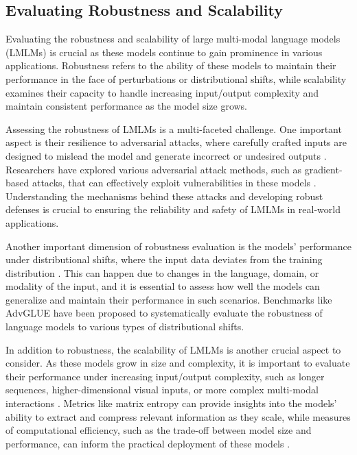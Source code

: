 \documentclass[11pt]{article}
\begin{document}
\subsection{Evaluating Robustness and Scalability}

Evaluating the robustness and scalability of large multi-modal language models (LMLMs) is crucial as these models continue to gain prominence in various applications. Robustness refers to the ability of these models to maintain their performance in the face of perturbations or distributional shifts, while scalability examines their capacity to handle increasing input/output complexity and maintain consistent performance as the model size grows.

Assessing the robustness of LMLMs is a multi-faceted challenge. One important aspect is their resilience to adversarial attacks, where carefully crafted inputs are designed to mislead the model and generate incorrect or undesired outputs \cite{ref174,ref102}. Researchers have explored various adversarial attack methods, such as gradient-based attacks, that can effectively exploit vulnerabilities in these models \cite{ref175,ref176}. Understanding the mechanisms behind these attacks and developing robust defenses is crucial to ensuring the reliability and safety of LMLMs in real-world applications.

Another important dimension of robustness evaluation is the models' performance under distributional shifts, where the input data deviates from the training distribution \cite{ref177}. This can happen due to changes in the language, domain, or modality of the input, and it is essential to assess how well the models can generalize and maintain their performance in such scenarios. Benchmarks like AdvGLUE \cite{ref178} have been proposed to systematically evaluate the robustness of language models to various types of distributional shifts.

In addition to robustness, the scalability of LMLMs is another crucial aspect to consider. As these models grow in size and complexity, it is important to evaluate their performance under increasing input/output complexity, such as longer sequences, higher-dimensional visual inputs, or more complex multi-modal interactions \cite{ref179}. Metrics like matrix entropy \cite{ref180} can provide insights into the models' ability to extract and compress relevant information as they scale, while measures of computational efficiency, such as the trade-off between model size and performance, can inform the practical deployment of these models \cite{ref181}.
\end{document}
